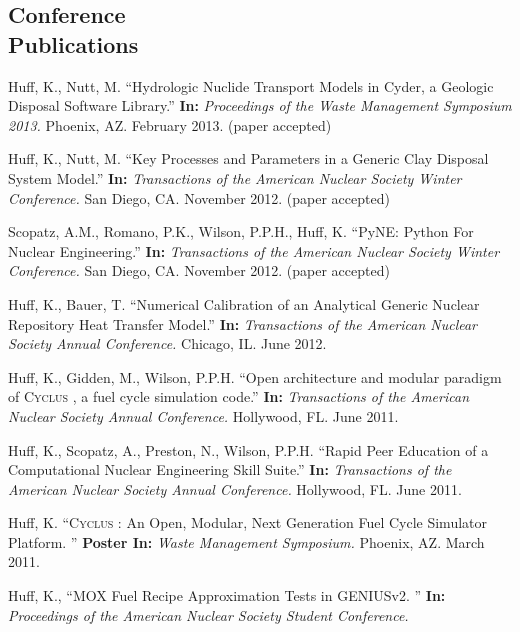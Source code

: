 \documentclass[margin,line]{resume}
\newcommand{\Cyclus}{\textsc{Cyclus }}
\begin{document}
\begin{resume}
    \section{\mysidestyle Conference\\Publications}
    \begin{bibenum}
      \item Huff, K., Nutt, M. ``Hydrologic Nuclide Transport Models in Cyder, a Geologic Disposal Software Library.''
        \textbf{In: } \emph{Proceedings of the Waste Management Symposium 2013.}
        Phoenix, AZ. February 2013. (paper accepted)
      \item Huff, K., Nutt, M. ``Key Processes and Parameters in a Generic Clay Disposal System Model.''
        \textbf{In: } \emph{Transactions of the American Nuclear Society Winter Conference.} 
        San Diego, CA. November 2012. (paper accepted)
      \item Scopatz, A.M., Romano, P.K., Wilson, P.P.H., Huff, K. ``PyNE: Python For Nuclear Engineering.''
        \textbf{In: } \emph{Transactions of the American Nuclear Society Winter Conference.} 
        San Diego, CA. November 2012. (paper accepted)
      \item Huff, K., Bauer, T. ``Numerical Calibration of an Analytical Generic Nuclear Repository Heat Transfer Model.''
        \textbf{In: } \emph{Transactions of the American Nuclear Society Annual Conference.} 
        Chicago, IL. June 2012.
      \item Huff, K., Gidden, M., Wilson, P.P.H. ``Open architecture and modular paradigm of \Cyclus, a fuel cycle simulation code.''
        \textbf{In: } \emph{Transactions of the American Nuclear Society Annual Conference.} 
        Hollywood, FL. June 2011.
      \item Huff, K., Scopatz, A., Preston, N., Wilson, P.P.H. ``Rapid Peer Education of a Computational Nuclear Engineering Skill Suite.'' 
        \textbf{In: } \emph{Transactions of the American Nuclear Society Annual Conference.} 
        Hollywood, FL. June 2011.
      \item Huff, K. ``\Cyclus: An Open, Modular, Next Generation Fuel Cycle Simulator Platform. ''
        \textbf{Poster In: } \emph{Waste Management Symposium.} Phoenix, AZ. March 
        2011.
      \item Huff, K., ``MOX Fuel Recipe Approximation Tests in GENIUSv2. ''
        \textbf{In: } \emph{Proceedings of the American Nuclear Society Student Conference.} 

\end{bibenum}
\end{resume}
\end{document}
